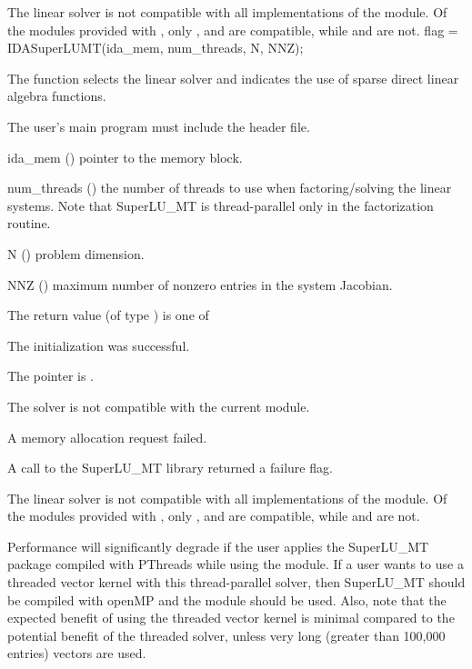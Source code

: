 {
  The {\idaklu} linear solver is not compatible with all
  implementations of the {\nvector} module. 
  Of the {\nvector} modules provided with {\sundials}, only {\nvecs},
  {\nvecopenmp} and {\nvecpthreads} are compatible, while {\nvecp} and
  {\nvecph} are not.
}
{
  flag = IDASuperLUMT(ida\_mem, num\_threads, N, NNZ);
}
{
  The function  selects the {\idasuperlumt} linear
  solver and indicates the use of sparse direct linear
  algebra functions.  

  The user's main program must include the  header file.
}
{
  \begin{args}
  \item[ida\_mem] ()
    pointer to the {\idas} memory block.
  \item[num\_threads] ()
    the number of threads to use when factoring/solving the linear systems.
    Note that SuperLU\_MT is thread-parallel only in the factorization routine.
  \item[N] ()
    problem dimension.
  \item[NNZ] ()
    maximum number of nonzero entries in the system Jacobian.
  \end{args}
}
{
  The return value  (of type ) is one of
  \begin{args}
  \item[\Id{IDASLS\_SUCCESS}] 
    The {\idasuperlumt} initialization was successful.
  \item[\Id{IDASLS\_MEM\_NULL}]
    The  pointer is .
  \item[\Id{IDASLS\_ILL\_INPUT}]
    The {\idasuperlumt} solver is not compatible with the current {\nvector} module.
  \item[\Id{IDASLS\_MEM\_FAIL}]
    A memory allocation request failed.
  \item[\Id{IDASLS\_PACKAGE\_FAIL}]
    A call to the SuperLU\_MT library returned a failure flag.
  \end{args}
}
{
  The {\idasuperlumt} linear solver is not compatible with all
  implementations of the {\nvector} module. 
  Of the {\nvector} modules provided with {\sundials}, only {\nvecs},
  {\nvecopenmp} and {\nvecpthreads} are compatible, while {\nvecp} and
  {\nvecph} are not.

  {\warn}Performance will significantly degrade if the user applies the SuperLU\_MT
  package compiled with PThreads while using the {\nvecopenmp} module.
  If a user wants to use a threaded vector kernel with this thread-parallel
  solver, then SuperLU\_MT should be compiled with openMP and the {\nvecopenmp}
  module should be used.  Also, note that the expected benefit of using the threaded
  vector kernel is minimal compared to the potential benefit of the threaded solver,
  unless very long (greater than 100,000 entries) vectors are used.
}

